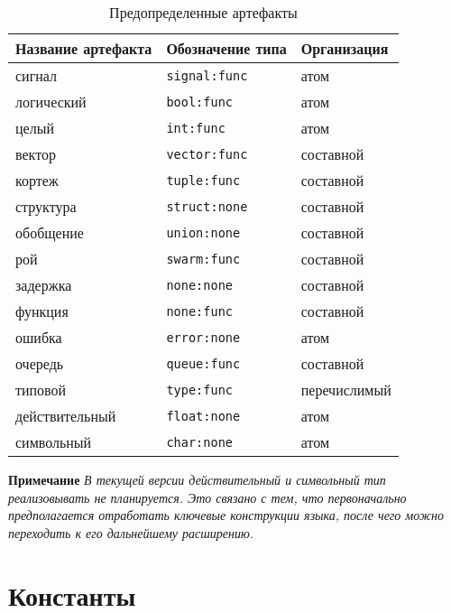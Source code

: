 {\begin{table}[h]
	\caption{Предопределенные артефакты}
	\begin{center}
		\begin{tabular}{lll}
			\textbf{Название артефакта} & \textbf{Обозначение типа} & \textbf{Организация} \\
			\hline
			сигнал  &   \verb|signal:func| &   атом    \\
			\hline
			логический  &   \verb|bool:func|   &  атом \\
			\hline
			целый   &   \verb|int:func|    &   атом    \\
			\hline
			вектор  &   \verb|vector:func| &   составной   \\
			\hline
			кортеж  &   \verb|tuple:func|  &   составной   \\
			\hline
			структура   &   \verb|struct:none| &   составной   \\
			\hline
			обобщение   &   \verb|union:none|  &   составной   \\
			\hline
			рой     &   \verb|swarm:func|  &   составной   \\
			\hline
			задержка  &   \verb|none:none|   &   составной   \\
			\hline
			функция &   \verb|none:func|   &   составной   \\
			\hline
			ошибка  &   \verb|error:none|  &   атом    \\
			\hline
			очередь &   \verb|queue:func|  &   составной   \\
			\hline
			типовой &   \verb|type:func|   &   перечислимый    \\
			\hline
			действительный  &   \verb|float:none|  &   атом    \\
			\hline
			символьный  &   \verb|char:none|   &   атом    \\
			\hline
		\end{tabular}
	\end{center}
    \label{tab-artefacts}
\end{table}

\textbf{Примечание}
\textit{В текущей версии действительный и символьный тип реализовывать не планируется. Это связано с тем, что первоначально предполагается отработать ключевые конструкции языка, после чего можно переходить к его дальнейшему расширению.}

\section{Константы}
\label{smile:const}

}
